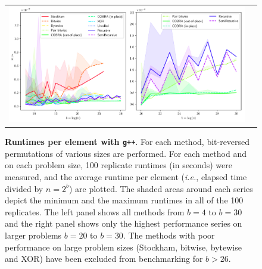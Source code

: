 ﻿\documentclass[10pt]{article}
\begin{document}
{\begin{figure}[ht!]
\centering
\begin{tabular}{cc}
  \includegraphics[width=6in]{results/g++_run_times.pdf}
\end{tabular}
\caption{{\bf Runtimes per element with {\tt g++}}. For each method,
  bit-reversed permutations of various sizes are performed. For each
  method and on each problem size, 100 replicate runtimes (in seconds)
  were measured, and the average runtime per element (\emph{i.e.},
  elapsed time divided by $n = 2^b$) are plotted. The shaded areas
  around each series depict the minimum and the maximum runtimes in 
  all of the 100 replicates. The left panel shows all
  methods from $b=4$ to $b=30$ and the right panel shows only the
  highest performance series on larger problems $b=20$ to $b=30$. The
  methods with poor performance on large problem sizes (Stockham,
  bitwise, bytewise and XOR) have been excluded from benchmarking for
  $b>26$.
  \label{fig:g++_runtimes}	
}
\end{figure}

}
\end{document}
